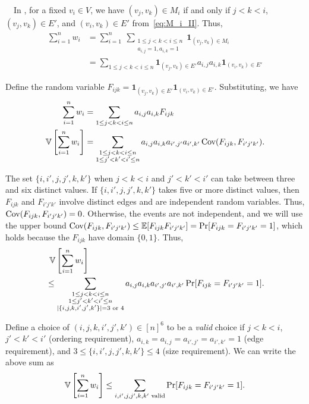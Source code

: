 {%
\smallskip
{}~~In \AlgTwo{}, for a fixed
$v_i \in V$, we have $(v_j, v_k) \in M_i$ if and only if
$j < k < i$, $(v_j, v_k) \in E'$, and $(v_i, v_k) \in E'$ from~\eqref{eq:M_i_II}. Thus,
\begin{align*}
\sum_{i=1}^n w_i &= \sum_{i=1}^n~\sum_{\substack{1 \leq j < k < i \leq n \\
a_{i,j} = 1, a_{i,k} = 1}} \textbf{1}_{(v_j, v_k) \in M_i} \\
&= \sum_{1 \leq j < k < i \leq n}
\textbf{1}_{(v_j, v_k) \in E'} a_{i,j}a_{i,k}\textbf{1}_{(v_i, v_k) \in E'}
\end{align*}

Define the random variable $F_{ijk} = \textbf{1}_{(v_j, v_k) \in
E'} \textbf{1}_{(v_i, v_k) \in E'}$. Substituting, we have
\begin{align*}
  \sum_{i=1}^n w_i &= \sum_{1 \leq j < k < i \leq n} a_{i,j} a_{i,k}F_{ijk} \\
  \operatorname{\mathbb{V}}\left[\sum_{i=1}^n w_i\right]
  &= \sum_{\substack{1 \leq j < k < i \leq n \\ 1 \leq j' < k' <
  i' \leq n}} a_{i,j} a_{i,k} a_{i',j'} a_{i',k'} \operatorname{\text{Cov}}(F_{ijk}, F_{i'j'k'}).
\end{align*}

The set $\{i,i',j,j',k,k'\}$ when $j < k < i$ and $j' < k' < i'$ can take between
three and six distinct values.
If $\{i,i', j,j', k,k'\}$ takes five or more distinct values, then $F_{ijk}$ and
$F_{i'j'k'}$ involve distinct edges and are independent random variables. Thus,
$\operatorname{\text{Cov}}(F_{ijk}, F_{i'j'k'}) = 0$. Otherwise, the events are not independent, and we will
use the upper bound $\operatorname{\text{Cov}}(F_{ijk}, F_{i'j'k'}) \leq \operatorname{\mathbb{E}}[F_{ijk}F_{i'j'k'}]
=
\Pr[F_{ijk} = F_{i'j'k'} = 1]$, which holds because the $F_{ijk}$ have domain $\{0,1\}$.
Thus,
\begin{align*}
&\;\operatorname{\mathbb{V}}\left[\sum_{i=1}^n w_i \right] \\
&\leq
  \sum_{\substack{1 \leq j < k < i \leq n \\ 1 \leq j' < k' <
  i' \leq n \\ |\{i,j,k,i',j',k'\}| = 3 \text{ or } 4}} a_{i,j} a_{i,k} a_{i',j'} a_{i',k'} \Pr[F_{ijk} = F_{i'j'k'} = 1].
\end{align*}

Define a choice of $(i,j,k,i',j',k') \in [n]^6$ to be a \emph{valid} choice if
$j < k < i$, $j' < k' < i'$ (ordering requirement),
$a_{i,k} = a_{i,j} = a_{i',j'} = a_{i', k'} = 1$ (edge requirement), and
$3 \leq \{i,i',j,j',k,k'\} \leq 4$ (size requirement). We can write the above sum as
\[
  \operatorname{\mathbb{V}}\left[\sum_{i=1}^n w_i \right] \leq
  \sum_{i,i',j,j',k,k'\text{ valid}} \Pr[F_{ijk} = F_{i'j'k'} = 1].
\]

}
